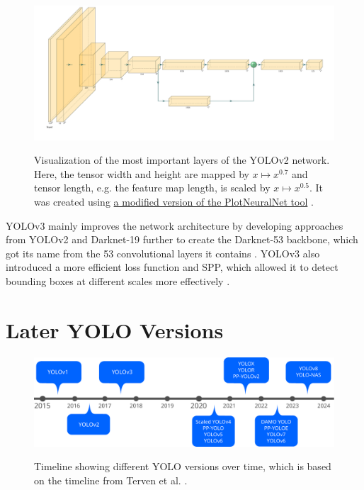 \documentclass[10pt]{book}
\begin{document}
\begin{figure}
  \caption{Visualization of the most important layers of the \ac{YOLO}v2 network. Here, the tensor width and height are mapped by $x \mapsto x^{0.7}$ and tensor length, e.g. the feature map length, is scaled by $x \mapsto x^{0.5}$. It was created using \href{https://github.com/jnccd/PlotNeuralNet}{a modified version of the PlotNeuralNet tool} \cite{haris_iqbal_2018_2526396}.}
  \includegraphics[width=\textwidth]{image/yolov2}
  \label{fig:yolov2}
\end{figure}

\ac{YOLO}v3 mainly improves the network architecture by developing approaches from \ac{YOLO}v2 and Darknet-19 further to create the Darknet-53 backbone, which got its name from the 53 convolutional layers it contains \cite{redmon2018yolov3}. \ac{YOLO}v3 also introduced a more efficient loss function and \ac{SPP}, which allowed it to detect bounding boxes at different scales more effectively \cite{jani2023model}. %

\section{Later YOLO Versions}

\begin{figure}
  \caption{Timeline showing different \ac{YOLO} versions over time, which is based on the timeline from Terven et al. \cite{terven2023comprehensive}.}
  \includegraphics[width=\textwidth]{image/yolo-timeline}
  \label{fig:yolo_timeline}
\end{figure}
\end{document}
